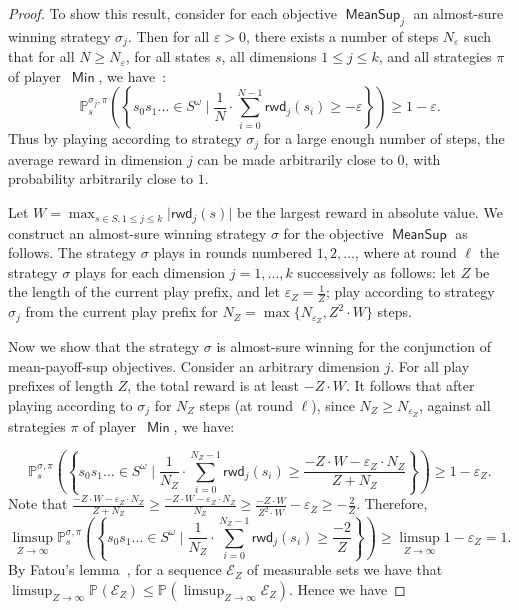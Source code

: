 \documentclass{article}
\def\abs#1{\ensuremath{\lvert #1\rvert}}
\let\epsilon\varepsilon
\newcommand{\cale}{\mathcal E}
\newcommand{\straa}{\sigma}
\newcommand{\strab}{\pi}
\DeclareMathOperator{\mi}{\mathsf{Min}}
\newcommand{\prob}[1]{\mathbb{P}_{#1}}
\newcommand{\rwd}{\mathsf{rwd}}
\newcommand{\MeanSup}{\operatorname{\mathsf{MeanSup}}}
\begin{document}
\begin{proof}
To show this result, consider for each objective $\MeanSup_j$ an almost-sure winning 
strategy $\straa_j$. Then for all $\epsilon > 0$, there exists a number of steps 
$N_{\epsilon}$ such that for all $N \geq N_{\epsilon}$,  for all states $s$, 
all dimensions $1 \leq j \leq k$, and all strategies $\strab$
of player~$\mi$, we have~\cite[Lemma~1]{CDGO14}:
$$ \prob{s}^{\straa_j,\strab}\left(\left\{ s_0 s_1 \dots \in S^\omega \mid \frac{1}{N} 
\cdot \sum_{i = 0}^{N-1} \rwd_j(s_{i}) \geq -\epsilon\right\}\right) \geq 1-\epsilon.$$
Thus by playing according to strategy $\straa_j$ for a large enough number of steps, 
the average reward in dimension $j$ can be made arbitrarily close to $0$,
with probability arbitrarily close to $1$.


Let $W = \max_{s \in S, 1 \leq j \leq k} \abs{\rwd_j(s)}$ be the 
largest reward in absolute value. We construct an almost-sure winning strategy $\straa$ for the objective $\MeanSup$ 
as follows. The strategy $\straa$ plays in rounds numbered $1,2,\dots$, where
at round $\ell$ the strategy $\straa$ plays for each dimension $j=1,\dots,k$ successively as follows:
let $Z$ be the length of the current play prefix, and let $\epsilon_Z = \frac{1}{Z}$;
play according to strategy $\straa_j$ from the current play prefix 
for $N_Z = \max\{N_{\epsilon_Z},Z^2\cdot W\}$ steps.

Now we show that the strategy $\straa$ is almost-sure winning for the conjunction
of mean-payoff-sup objectives. Consider an arbitrary dimension $j$. For all
play prefixes of length $Z$, the total reward is at least $-Z \cdot W$. 
It follows that after playing according to $\straa_j$ for $N_Z$ steps (at round $\ell$), 
since $N_Z \geq N_{\epsilon_Z}$, against all strategies $\strab$ of player~$\mi$, we have:

$$\prob{s}^{\straa,\strab}\left(\left\{ s_0 s_1 \dots \in S^\omega \mid \frac{1}{N_{Z}} 
\cdot \sum_{i = 0}^{N_{Z}-1} \rwd_j(s_{i}) \geq \frac{-Z\cdot W - \epsilon_Z \cdot N_{Z}}{Z+N_{Z}} \right\}\right) 
\geq 1-\epsilon_Z.
$$
Note that $\frac{-Z \cdot W - \epsilon_Z \cdot N_{Z}}{Z+N_{Z}} \geq 
\frac{-Z \cdot W - \epsilon_Z \cdot N_{Z}}{N_{Z}} \geq
\frac{-Z \cdot W}{Z^2\cdot W} - \epsilon_Z \geq
- \frac{2}{Z}$.
Therefore,
$$\limsup_{Z \to \infty} \prob{s}^{\straa,\strab} \left(\left\{ s_0 s_1 \dots \in S^\omega \mid \frac{1}{N_{Z}} 
\cdot \sum_{i = 0}^{N_{Z}-1} \rwd_j(s_{i}) \geq \frac{-2}{Z} \right\}\right)
\geq  \limsup_{Z \to \infty} 1-\epsilon_Z = 1.
$$
By Fatou's lemma~\cite{Billingsley}, for a sequence $\cale_Z$ of measurable sets we have that 
$\limsup_{Z \to\infty}\prob{}(\cale_Z) \leq \prob{}(\limsup_{Z\to\infty} \cale_Z)$.
Hence we have 


\end{proof}
\end{document}
